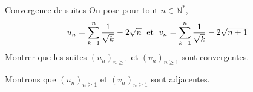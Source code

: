 \documentclass[a4paper,10pt]{report}
\begin{document}
\everymath{\displaystyle}

\begin{center}
\end{center}

\bigskip


\setlength{\shadowsize}{2pt} 



\begin{Exercice}{Convergence de suites}
On pose pour tout $n \in \mathbb{N}^*$, 
    \[
    u_n = \sum_{k = 1}^n {\frac{1}{\sqrt k}} - 2\sqrt n \; \hbox{ et } \; v_n = \sum_{k = 1}^n {\frac{1}{\sqrt k}} - 2\sqrt {n + 1}
    \]
 Montrer que les suites $(u_n)_{n \geq 1}$ et $(v_n)_{n \geq 1}$ sont convergentes.
 \end{Exercice}
 
 
\corr Montrons que $(u_n)_{n \geq 1}$ et $(v_n)_{n \geq 1}$ sont adjacentes.
\end{document}
